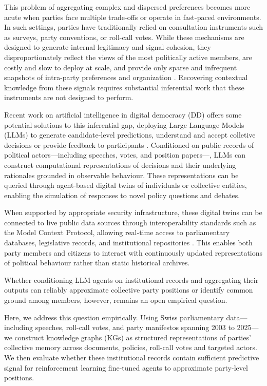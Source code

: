 \documentclass[letterpaper]{article}
\begin{document}
This problem of aggregating complex and dispersed preferences becomes more acute when parties face multiple trade-offs or operate in fast-paced environments. In such settings, parties have traditionally relied on consultation instruments such as surveys, party conventions, or roll-call votes. While these mechanisms are designed to generate internal legitimacy and signal cohesion, they disproportionately reflect the views of the most politically active members, are costly and slow to deploy at scale, and provide only sparse and infrequent snapshots of intra-party preferences and organization \citep{novelli2024artificial}. Recovering contextual knowledge from these signals requires substantial inferential work that these instruments are not designed to perform.

Recent work on artificial intelligence in digital democracy (DD) offers some potential solutions to this inferential gap, deploying Large Language Models (LLMs) to generate candidate-level predictions, understand and accept colletive decisions or provide feedback to participants \citep{gudino2024large, berdoz2026reasoning, pradeep2026agora, fulay2026ai}. Conditioned on public records of political actors---including speeches, votes, and position papers---, LLMs can construct computational representations of decisions and their underlying rationales grounded in observable behaviour. These representations can be queried through agent-based digital twins of individuals or collective entities, enabling the simulation of responses to novel policy questions and debates.

When supported by appropriate security infrastructure, these digital twins can be connected to live public data sources through interoperability standards such as the Model Context Protocol, allowing real-time access to parliamentary databases, legislative records, and institutional repositories \citep{shah2025robust}. This enables both party members and citizens to interact with continuously updated representations of political behaviour rather than static historical archives.

Whether conditioning LLM agents on institutional records and aggregating their outputs can reliably approximate collective party positions or identify common ground among members, however, remains an open empirical question.

Here, we address this question empirically. Using Swiss parliamentary data—including speeches, roll-call votes, and party manifestos spanning 2003 to 2025—we construct knowledge graphs (KGs) as structured representations of parties’ collective memory across documents, policies, roll-call votes and targeted actors. We then evaluate whether these institutional records contain sufficient predictive signal for reinforcement learning fine-tuned agents to approximate party-level positions.
\end{document}
